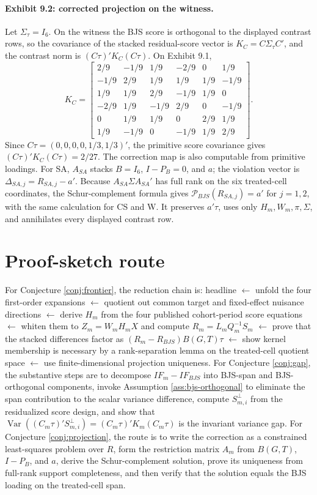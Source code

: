 \documentclass[11pt]{article}
\theoremstyle{definition}
\theoremstyle{plain}
\theoremstyle{remark}
\begin{document}
\paragraph{Exhibit 9.2: corrected projection on the witness.}
Let \(\Sigma_\tau=I_6\). On the witness the BJS score is orthogonal to the displayed contrast rows, so the covariance of the stacked residual-score vector is \(K_C=C\Sigma_\tau C'\), and the contrast norm is \((C\tau)'K_C(C\tau)\). On Exhibit 9.1,
\[
K_C=\begin{bmatrix}
2/9&-1/9&1/9&-2/9&0&1/9\\
-1/9&2/9&1/9&1/9&1/9&-1/9\\
1/9&1/9&2/9&-1/9&1/9&0\\
-2/9&1/9&-1/9&2/9&0&-1/9\\
0&1/9&1/9&0&2/9&1/9\\
1/9&-1/9&0&-1/9&1/9&2/9
\end{bmatrix}.
\]
Since \(C\tau=(0,0,0,0,1/3,1/3)'\), the primitive score covariance gives \((C\tau)'K_C(C\tau)=2/27\). The correction map is also computable from primitive loadings. For SA, \(A_{SA}\) stacks \(B=I_6\), \(I-P_B=0\), and \(a\); the violation vector is \(\Delta_{SA,j}=R_{SA,j}-a'\). Because \(A_{SA}\Sigma A_{SA}'\) has full rank on the six treated-cell coordinates, the Schur-complement formula gives \(\mathcal P_{BJS}(R_{SA,j})=a'\) for \(j=1,2\), with the same calculation for CS and W. It preserves \(a'\tau\), uses only \(H_m,W_m,\pi,\Sigma\), and annihilates every displayed contrast row.

\section{Proof-sketch route}
For Conjecture \ref{conj:frontier}, the reduction chain is: headline \(\leftarrow\) unfold the four first-order expansions \(\leftarrow\) quotient out common target and fixed-effect nuisance directions \(\leftarrow\) derive \(H_m\) from the four published cohort-period score equations \(\leftarrow\) whiten them to \(Z_m=W_mH_mX\) and compute \(R_m=L_mQ_m^{-1}S_m\) \(\leftarrow\) prove that the stacked differences factor as \((R_m-R_{BJS})B(G,T)\tau\) \(\leftarrow\) show kernel membership is necessary by a rank-separation lemma on the treated-cell quotient space \(\leftarrow\) use finite-dimensional projection uniqueness. For Conjecture \ref{conj:gap}, the substantive steps are to decompose \(IF_m-IF_{BJS}\) into BJS-span and BJS-orthogonal components, invoke Assumption \ref{ass:bjs-orthogonal} to eliminate the span contribution to the scalar variance difference, compute \(S_{m,i}^{\perp}\) from the residualized score design, and show that \(\operatorname{Var}((C_m\tau)'S_{m,i}^{\perp})=(C_m\tau)'K_m(C_m\tau)\) is the invariant variance gap. For Conjecture \ref{conj:projection}, the route is to write the correction as a constrained least-squares problem over \(R\), form the restriction matrix \(A_m\) from \(B(G,T)\), \(I-P_B\), and \(a\), derive the Schur-complement solution, prove its uniqueness from full-rank support completeness, and then verify that the solution equals the BJS loading on the treated-cell span.
\end{document}
